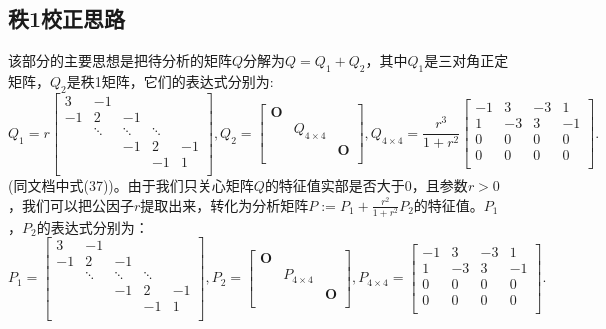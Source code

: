 \documentclass[UTF8]{ctexart}
\theoremstyle{plain}
\theoremstyle{definition}
\theoremstyle{remark}
\begin{document}
\subsection{秩1校正思路}
该部分的主要思想是把待分析的矩阵$Q$分解为$Q=Q_{1}+Q_{2}$，其中$Q_1$是三对角正定矩阵，$Q_2$是秩1矩阵，它们的表达式分别为:
\begin{equation}
    \label{eq:rank1repair}
    Q_{1}=r\begin{bmatrix}
        3&-1& & &\\
        -1&2&-1& & \\
         &\ddots&\ddots&\ddots& \\
         & &-1&2&-1\\
         & & &-1&1\\
    \end{bmatrix}
    ,Q_{2}=\begin{bmatrix}
        \mathbf{O}& & \\
        & Q_{4\times 4}& \\
        & & \mathbf{O}\\
    \end{bmatrix}
    ,Q_{4\times 4}=\frac{r^3}{1+r^2}\begin{bmatrix}
        -1&3&-3&1\\
        1&-3&3&-1\\
        0&0&0&0\\
        0&0&0&0\\
    \end{bmatrix}.
\end{equation}
(同文档中式(37))。由于我们只关心矩阵$Q$的特征值实部是否大于0，且参数$r>0$，我们可以把公因子$r$提取出来，转化为分析矩阵$P:=P_{1}+\frac{r^{2}}{1+r^{2}}P_{2}$的特征值。$P_{1}$，$P_{2}$的表达式分别为：
\begin{equation}
    \label{eq:rank1repairP}
    P_{1}=\begin{bmatrix}
        3&-1& & &\\
        -1&2&-1& & \\
         &\ddots&\ddots&\ddots& \\
         & &-1&2&-1\\
         & & &-1&1\\
    \end{bmatrix}
    ,P_{2}=\begin{bmatrix}
        \mathbf{O}& & \\
        & P_{4\times 4}& \\
        & & \mathbf{O}\\
    \end{bmatrix}
    ,P_{4\times 4}=\begin{bmatrix}
        -1&3&-3&1\\
        1&-3&3&-1\\
        0&0&0&0\\
        0&0&0&0\\
    \end{bmatrix}.    
\end{equation}
\end{document}
